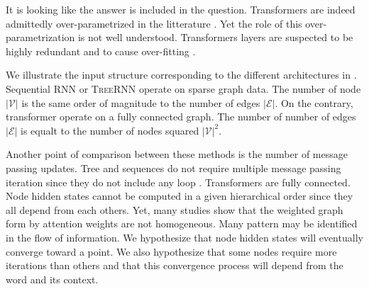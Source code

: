 It is looking like the answer is included in the question. 
Transformers are indeed admittedly over-parametrized in the litterature \parencite{chen_20, hou_20, voita_19}. 
Yet the role of this over-parametrization is not well understood. 
Transformers layers are suspected to be highly redundant \parencite{liu_20} and to cause over-fitting \parencite{fan_20, zhou_20b}. 

We illustrate the input structure corresponding to the different architectures in .
Sequential \textsc{RNN} or \textsc{TreeRNN} operate on sparse graph data.
The number of node $|\mathcal{V}|$ is the same order of magnitude to the number of edges $|\mathcal{E}|$.
On the contrary, transformer operate on a fully connected graph. 
The number of number of edges $|\mathcal{E}|$ is equalt to the number of nodes squared $|\mathcal{V}|^2$.

Another point of comparison between these methods is the number of message passing updates.
Tree and sequences do not require multiple message passing iteration since they do not include any loop .
Transformers are fully connected. Node hidden states cannot be computed in a given hierarchical order since they all depend from each others.
Yet, many studies show that the weighted graph form by attention weights are not homogeneous.
Many pattern may be identified in the flow of information.
We hypothesize that node hidden states will eventually converge toward a  point.
We also hypothesize that some nodes require more iterations than others and that this convergence process will depend from the word and its context.





